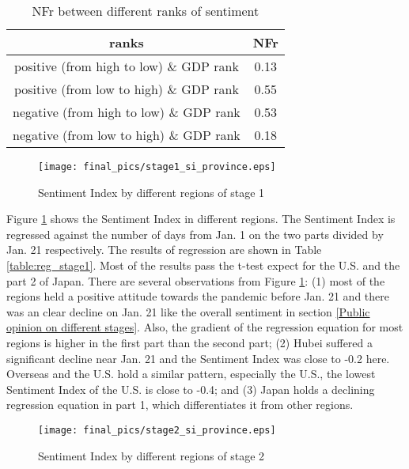 \documentclass[sigconf, nonacm=true]{acmart}
\begin{document}
\begin{table}[t]
\begin{tabular}{|c|c|}
\hline
ranks &  NFr  \\  \hline
positive (from high to low) \& GDP rank  &  0.13   \\ \hline
positive (from low to high) \& GDP rank  &   0.55 \\ \hline
negative (from high to low) \& GDP rank  &  0.53  \\ \hline
negative (from low to high) \& GDP rank  &  0.18  \\ \hline
\end{tabular}
\vspace{0.2cm}
\caption{NFr between different ranks of sentiment}
\label{table:nfr}
\vspace{-.4cm}
\end{table}

\begin{figure}[t]
  \texttt{[image: final\_pics/stage1\_si\_province.eps]}
  \vspace{-0.3cm}
  \caption{Sentiment Index by different regions of stage 1}
  \label{figure:stage1_si_province}
\end{figure}

Figure \ref{figure:stage1_si_province} shows the Sentiment Index in different regions.
The Sentiment Index is regressed against the number of days from Jan. 1 on the two parts divided by Jan. 21 respectively. The results of regression are shown in  Table \ref{table:reg_stage1}.
Most of the results pass the t-test expect for the U.S. and the part 2 of Japan.
There are several observations from Figure \ref{figure:stage1_si_province}:
(1) most of the regions held a positive attitude towards the pandemic before Jan. 21 and there was an clear decline on Jan. 21 like the overall sentiment in section \ref{Public opinion on different stages}.
Also, the gradient of the regression equation for most regions is higher in the first part than the second part;
(2) Hubei suffered a significant decline near Jan. 21 and the Sentiment Index was close to -0.2 here.
Overseas and the U.S. hold a similar pattern, especially the U.S., the lowest Sentiment Index of the U.S. is close to -0.4; and 
(3) Japan holds a declining regression equation in part 1, which differentiates it from other regions.

\begin{figure}[t]
  \texttt{[image: final\_pics/stage2\_si\_province.eps]}
  \caption{Sentiment Index by different regions of stage 2}
  \label{figure:stage2_si_province}
\end{figure}
\end{document}
